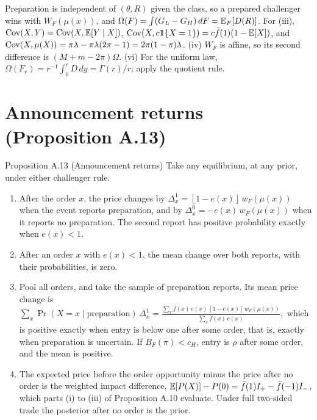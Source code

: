 {\small\begin{derivation}[proof]
Preparation is independent of \((\theta,R)\) given the class, so a prepared challenger wins with \(W_F(\mu(x))\), and
\(\Omega(F)=\int(G_L-G_H)\,dF=\mathbb{E}_F[D(R)]\). For (iii), \(\operatorname{Cov}(X,Y)=\operatorname{Cov}(X,\mathbb{E}[Y\mid X])\),
\(\operatorname{Cov}(X,c\mathbf{1}\{X=1\})=c\bar f(1)(1-\mathbb{E}[X])\), and \(\operatorname{Cov}(X,\mu(X))=\pi\lambda-\pi\lambda(2\pi-1)=2\pi(1-\pi)\lambda\).
(iv) \(W_F\) is affine, so its second difference is \((M+m-2\pi)\Omega\). (vi) For the uniform law,
\(\Omega(F_r)=r^{-1}\int_0^rD\,dy=\Gamma(r)/r\); apply the quotient rule.
\end{derivation}}

\section{Announcement returns (Proposition A.13)}\label{sec:empirical-announce}

{\small
\begin{paperresult}{Proposition A.13 (Announcement returns)}
Take any equilibrium, at any prior, under either challenger rule.
\begin{enumerate}[label=(\roman*),leftmargin=2em,nosep]
\item After the order \(x\), the price changes by \(\Delta^1_x=[1-e(x)]\,w_F(\mu(x))\) when the event reports preparation, and by \(\Delta^0_x=-e(x)\,w_F(\mu(x))\) when it reports no preparation. The second report has positive probability exactly when \(e(x)<1\).
\item After an order \(x\) with \(e(x)<1\), the mean change over both reports, with their probabilities, is zero.
\item Pool all orders, and take the sample of preparation reports. Its mean price change is
\(
\sum_x\Pr(X=x\mid\text{preparation})\,\Delta^1_x=\frac{\sum_x\bar f(x)\,e(x)\,[1-e(x)]\,w_F(\mu(x))}{\sum_x\bar f(x)\,e(x)},
\)
which is positive exactly when entry is below one after some order, that is, exactly when preparation is uncertain. If \(B_F(\pi)<c_H\), entry is \(\rho\) after some order, and the mean is positive.
\item The expected price before the order opportunity minus the price after no order is the weighted impact difference, \(\mathbb{E}[P(X)]-P(0)=\bar f(1)I_+-\bar f(-1)I_-\), which parts (i) to (iii) of Proposition A.10 evaluate. Under full two-sided trade the posterior after no order is the prior.
\end{enumerate}
\end{paperresult}}

